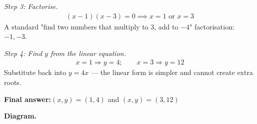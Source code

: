 \documentclass[11pt]{article}
\begin{document}
\textit{Step 3: Factorise.}
\[\begin{gathered}
(x - 1)(x - 3) = 0 \implies x = 1 \text{ or } x = 3
\end{gathered}\]
A standard "find two numbers that multiply to 3, add to \( -4 \)" factorisation: \( -1, -3 \).

\textit{Step 4: Find \( y \) from the linear equation.}
\[\begin{gathered}
x = 1 \Rightarrow y = 4; \qquad x = 3 \Rightarrow y = 12
\end{gathered}\]
Substitute back into \( y = 4x \) --- the linear form is simpler and cannot create extra roots.

\begin{answerbox}
\textbf{Final answer:}\quad \(\displaystyle (x, y) = (1, 4)\) and \(\displaystyle (x, y) = (3, 12)\)
\end{answerbox}
\textbf{Diagram.}
\end{document}
